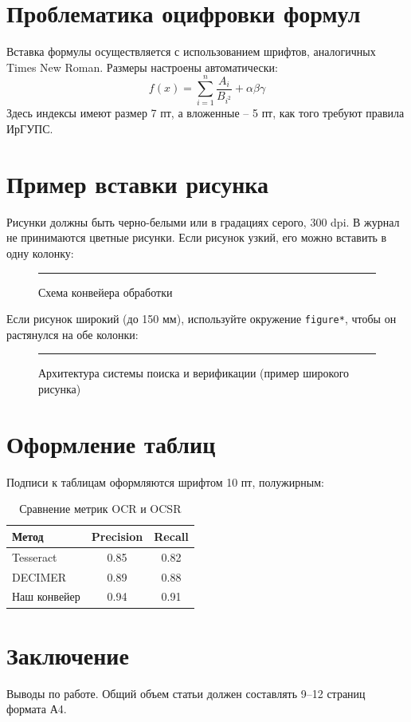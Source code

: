 \section*{Проблематика оцифровки формул}
Вставка формулы осуществляется с использованием шрифтов, аналогичных Times New Roman. Размеры настроены автоматически:
\begin{equation}
	f(x) = \sum_{i=1}^{n} \frac{A_i}{B_{i^2}} + \alpha \beta \gamma
\end{equation}
Здесь индексы имеют размер 7 пт, а вложенные -- 5 пт, как того требуют правила ИрГУПС.

\section*{Пример вставки рисунка}
Рисунки должны быть черно-белыми или в градациях серого, 300 dpi. В журнал не принимаются цветные рисунки.
Если рисунок узкий, его можно вставить в одну колонку:

\begin{figure}[h]
	\centering
	\rule{\linewidth}{4cm} %
	\caption{Схема конвейера обработки}
	\label{fig:pipeline}
\end{figure}

Если рисунок широкий (до 150 мм), используйте окружение \texttt{figure*}, чтобы он растянулся на обе колонки:

\begin{figure}[t]
	\centering
	\rule{150mm}{5cm} %
	\caption{Архитектура системы поиска и верификации (пример широкого рисунка)}
	\label{fig:architecture}
\end{figure}

\section*{Оформление таблиц}
Подписи к таблицам оформляются шрифтом 10 пт, полужирным:

\begin{table}[h]
	\centering
	\caption{Сравнение метрик OCR и OCSR}
	\begin{tabular}{|p{3cm}|c|c|}
		\hline
		Метод & Precision & Recall \\
		\hline
		Tesseract & 0.85 & 0.82 \\
		DECIMER & 0.89 & 0.88 \\
		Наш конвейер & 0.94 & 0.91 \\
		\hline
	\end{tabular}
\end{table}

\section*{Заключение}
Выводы по работе. Общий объем статьи должен составлять 9–12 страниц формата А4.